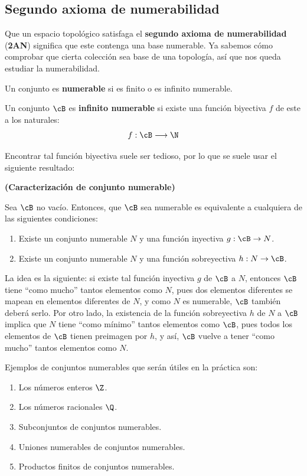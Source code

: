 \subsection*{Segundo axioma de numerabilidad}

Que un espacio topológico satisfaga el {\bf segundo axioma de numerabilidad} ({\bf 2AN}) significa que este contenga una base numerable. Ya sabemos cómo comprobar que cierta colección sea base de una topología, así que nos queda estudiar la numerabilidad.

\begin{deff}
    Un conjunto es {\bf numerable} si es finito o es infinito numerable.
\end{deff}

\begin{deff}
    Un conjunto $\cB$ es {\bf infinito numerable} si existe una función biyectiva $f$ de este a los naturales:
    \[f: \cB \longrightarrow \N\]
\end{deff}

Encontrar tal función biyectiva suele ser tedioso, por lo que se suele usar el siguiente resultado:

\begin{prop}
    {\bf (Caracterización de conjunto numerable)}
    \item Sea $\cB$ no vacío. Entonces, que $\cB$ sea numerable es equivalente a cualquiera de las siguientes condiciones:
    \begin{enumerate}[label=\roman*)]
        \item Existe un conjunto numerable $N$ y una función inyectiva $g: \cB \to N$.
        \item Existe un conjunto numerable $N$ y una función sobreyectiva $h: N \to \cB$.
    \end{enumerate}
    La idea es la siguiente: si existe tal función inyectiva $g$ de $\cB$ a $N$, entonces $\cB$ tiene ``como mucho'' tantos elementos como $N$, pues dos elementos diferentes se mapean en elementos diferentes de $N$, y como $N$ es numerable, $\cB$ también deberá serlo. Por otro lado, la existencia de la función sobreyectiva $h$ de $N$ a $\cB$ implica que $N$ tiene ``como mínimo'' tantos elementos como $\cB$, pues todos los elementos de $\cB$ tienen preimagen por $h$, y así, $\cB$ vuelve a tener ``como mucho'' tantos elementos como $N$.
\end{prop}

Ejemplos de conjuntos numerables que serán útiles en la práctica son:
\begin{enumerate}[topsep=5pt,label=--, itemsep=0pt]
    \item Los números enteros $\Z$.
    \item Los números racionales $\Q$.
    \item Subconjuntos de conjuntos numerables.
    \item Uniones numerables de conjuntos numerables.
    \item Productos finitos de conjuntos numerables.
\end{enumerate}


